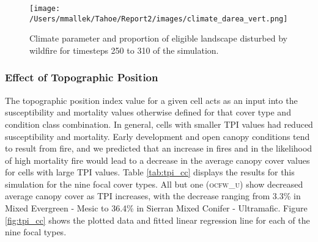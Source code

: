 \begin{figure}[!htbp]
\centering
\texttt{[image: /Users/mmallek/Tahoe/Report2/images/climate\_darea\_vert.png]}
\caption{Climate parameter and proportion of eligible landscape disturbed by wildfire for timesteps 250 to 310 of the simulation.}
\label{fig:compare_clim_darea}
\end{figure}

\clearpage
\subsubsection{Effect of Topographic Position} 

The topographic position index value for a given cell acts as an input into the susceptibility and mortality values otherwise defined for that cover type and condition class combination. In general, cells with smaller TPI values had reduced susceptibility and mortality. Early development and open canopy conditions tend to result from fire, and we predicted that an increase in fires and in the likelihood of high mortality fire would lead to a decrease in the average canopy cover values for cells with large TPI values. Table \ref{tab:tpi_cc} displays the results for this simulation for the nine focal cover types. All but one (\textsc{ocfw\_u}) show decreased average canopy cover as TPI increases, with the decrease ranging from 3.3\% in Mixed Evergreen - Mesic to 36.4\% in Sierran Mixed Conifer - Ultramafic. Figure \ref{fig:tpi_cc} shows the plotted data and fitted linear regression line for each of the nine focal types.

